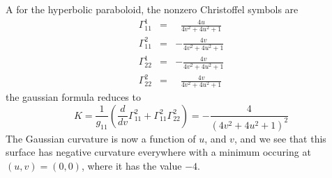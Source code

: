 \begin{myex}
A for the hyperbolic paraboloid, the  nonzero Christoffel symbols are
\begin{eqnarray*}
   \Gamma_{11}^1 &=&  \;\;\frac{4u}{4v^2+4u^2+1} \\ 
   \Gamma_{11}^2 &=& -\frac{4v}{4v^2+4u^2+1} \\ 
   \Gamma_{22}^1 &=& -\frac{4v}{4v^2+4u^2+1} \\ 
   \Gamma_{22}^2 &=& \;\;\frac{4v}{4v^2+4u^2+1} 
\end{eqnarray*}
the gaussian formula reduces to
$$
   K = \frac{1}{g_{11}} \left(\frac{d}{dv}\Gamma_{11}^2 + \Gamma_{11}^2\Gamma_{22}^2 \right)
     = -\frac{4}{(4v^2+4u^2+1)^2}
$$
The Gaussian curvature is now a function of $u$, and $v$,
and we see that this surface has negative curvature everywhere with a minimum
occuring at $(u,v)=(0,0)$, where it has the value $-4$.
\end{myex}

